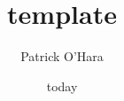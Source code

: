\documentclass{article}
\title{template}
\date{today}
\author{Patrick O'Hara}
\begin{document}
\maketitle

\citep{Dijkstra1959}


\end{document}
